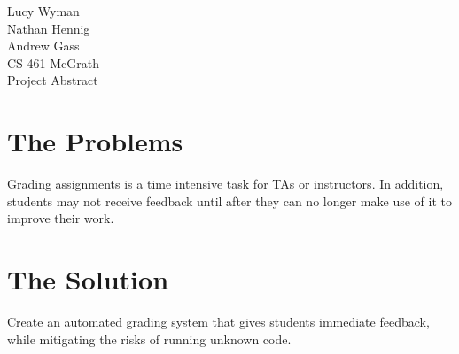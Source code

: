 \documentclass[12pt]{article}
\begin{document}
\noindent
Lucy Wyman\\
Nathan Hennig\\
Andrew Gass\\
CS 461 McGrath\\
Project Abstract\\

\section{The Problems}
	Grading assignments is a time intensive task for TAs or 
	instructors. In addition, students may not receive feedback
	until after they can no longer make use of it to improve their work.

\section{The Solution}
	Create an automated grading system that gives students immediate 
	feedback, while mitigating the risks of running unknown code.
\end{document}
